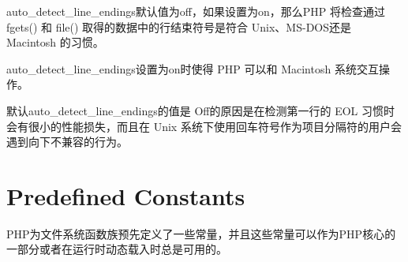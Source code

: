auto\_detect\_line\_endings默认值为off，如果设置为on，那么PHP 将检查通过 fgets() 和 file() 取得的数据中的行结束符号是符合 Unix、MS-DOS还是 Macintosh 的习惯。


auto\_detect\_line\_endings设置为on时使得 PHP 可以和 Macintosh 系统交互操作。

默认auto\_detect\_line\_endings的值是 Off的原因是在检测第一行的 EOL 习惯时会有很小的性能损失，而且在 Unix 系统下使用回车符号作为项目分隔符的用户会遇到向下不兼容的行为。


\section{Predefined Constants}

PHP为文件系统函数族预先定义了一些常量，并且这些常量可以作为PHP核心的一部分或者在运行时动态载入时总是可用的。


